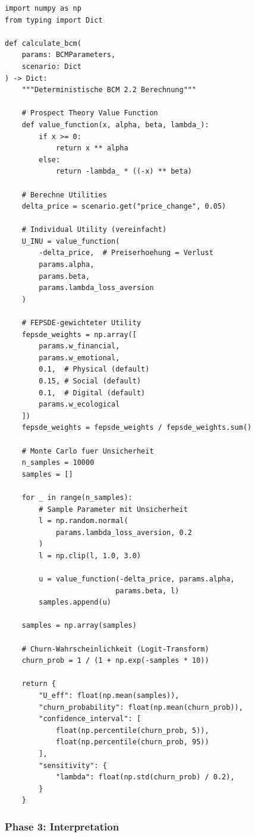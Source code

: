\documentclass[12pt,a4paper]{article}
\begin{document}
\begin{lstlisting}[caption={Phase 2: Deterministische BCM-Berechnung}]
import numpy as np
from typing import Dict

def calculate_bcm(
    params: BCMParameters,
    scenario: Dict
) -> Dict:
    """Deterministische BCM 2.2 Berechnung"""

    # Prospect Theory Value Function
    def value_function(x, alpha, beta, lambda_):
        if x >= 0:
            return x ** alpha
        else:
            return -lambda_ * ((-x) ** beta)

    # Berechne Utilities
    delta_price = scenario.get("price_change", 0.05)

    # Individual Utility (vereinfacht)
    U_INU = value_function(
        -delta_price,  # Preiserhoehung = Verlust
        params.alpha,
        params.beta,
        params.lambda_loss_aversion
    )

    # FEPSDE-gewichteter Utility
    fepsde_weights = np.array([
        params.w_financial,
        params.w_emotional,
        0.1,  # Physical (default)
        0.15, # Social (default)
        0.1,  # Digital (default)
        params.w_ecological
    ])
    fepsde_weights = fepsde_weights / fepsde_weights.sum()

    # Monte Carlo fuer Unsicherheit
    n_samples = 10000
    samples = []

    for _ in range(n_samples):
        # Sample Parameter mit Unsicherheit
        l = np.random.normal(
            params.lambda_loss_aversion, 0.2
        )
        l = np.clip(l, 1.0, 3.0)

        u = value_function(-delta_price, params.alpha,
                          params.beta, l)
        samples.append(u)

    samples = np.array(samples)

    # Churn-Wahrscheinlichkeit (Logit-Transform)
    churn_prob = 1 / (1 + np.exp(-samples * 10))

    return {
        "U_eff": float(np.mean(samples)),
        "churn_probability": float(np.mean(churn_prob)),
        "confidence_interval": [
            float(np.percentile(churn_prob, 5)),
            float(np.percentile(churn_prob, 95))
        ],
        "sensitivity": {
            "lambda": float(np.std(churn_prob) / 0.2),
        }
    }
\end{lstlisting}

\subsubsection{Phase 3: Interpretation}
\end{document}
